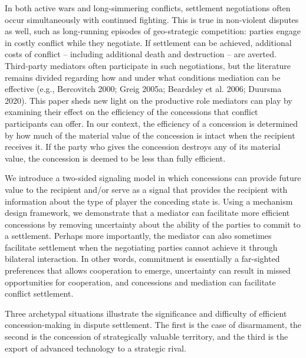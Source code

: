 \documentclass[12pt, letterpaper]{article}
\begin{document}
In both active wars and long-simmering conflicts, settlement negotiations often occur simultaneously with continued fighting. This is true in non-violent disputes as well, such as long-running episodes of geo-strategic competition: parties engage in costly conflict while they negotiate. If settlement can be achieved, additional costs of conflict -- including additional death and destruction -- are averted. Third-party mediators often participate in such negotiations, but the literature remains divided regarding how and under what conditions mediation can be effective (e.g., Bercovitch 2000; Greig 2005a; Beardsley et al. 2006; Duursma 2020).  This paper sheds new light on the productive role mediators can play by examining their effect on the efficiency of the concessions that conflict participants can offer. In our context, the efficiency of a concession is determined by how much of the material value of the concession is intact when the recipient receives it. If the party who gives the concession destroys any of its material value, the concession is deemed to be less than fully efficient.

We introduce a two-sided signaling model in which concessions can provide future value to the recipient and/or serve as a signal that provides the recipient with information about the type of player the conceding state is. Using a mechanism design framework, we demonstrate that a mediator can facilitate more efficient concessions by removing uncertainty about the ability of the parties to commit to a settlement. Perhaps more importantly, the mediator can also sometimes facilitate settlement when the negotiating parties cannot achieve it through bilateral interaction. In other words, commitment is essentially a far-sighted preferences that allows cooperation to emerge, uncertainty can result in missed opportunities for cooperation, and concessions and mediation can facilitate conflict settlement.

Three archetypal situations illustrate the significance and difficulty of efficient concession-making in dispute settlement.  The first is the case of disarmament, the second is the concession of strategically valuable territory, and the third is the export of advanced technology to a strategic rival. %
\end{document}

